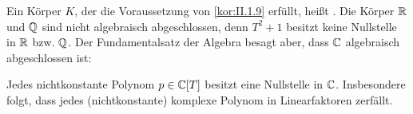 \begin{bemerkung}
	\label{bem:II.1.10}
	Ein Körper $K$, der die Voraussetzung von \autoref{kor:II.1.9} erfüllt, heißt .
	Die Körper $\mathbb{R}$ und $\mathbb{Q}$ sind nicht algebraisch abgeschlossen, denn $T^2+1$ besitzt keine Nullstelle in $\mathbb{R}$ bzw. $\mathbb{Q}$.
	Der Fundamentalsatz der Algebra besagt aber, dass $\mathbb{C}$ algebraisch abgeschlossen ist:
\end{bemerkung}
\newpage
\begin{satz}
	\label{satz:II.1.11}
	Jedes nichtkonstante Polynom $p \in \mathbb{C}[T]$ besitzt eine Nullstelle in $\mathbb{C}$.
	Insbesondere folgt, dass jedes (nichtkonstante) komplexe Polynom in Linearfaktoren zerfällt. 
\end{satz}

